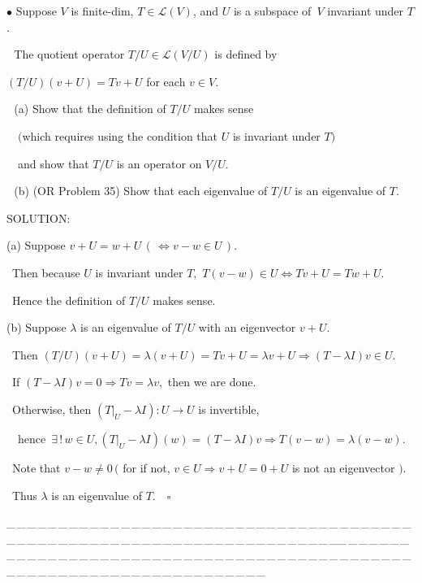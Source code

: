 \documentclass[a4paper, 11pt, UTF8]{article}
\def\Lm{\mathcal{L}}
\begin{document}
\begin{large}
{\small $\bullet$} {\timessl\Large 
Suppose $V$ is finite-dim, $T\in\Lm(V)$, and $U$ is a subspace of \,$V$ invariant under $T$.}\par\,\,
{\timessl\Large The quotient operator $T/U\in\Lm(V/U)$ is defined by}\par \centerline{\timessl\Large $(T/U)(v + U) = Tv + U$ for each $v\in V$.}\par\,\,
(a) {\timessl\Large Show that the definition of $T/U$ makes sense}\par\quad\,\,\,\,
$(${\timessl\Large which requires using the condition that $U$ is invariant under $T$}$)$\par\quad\,\,\,\,
{\timessl\Large and show that $T/U$ is an operator on $V/U$.}\par\,\,
(b) {\normalsize (O{\footnotesize R} Problem 35)} {\timessl\Large Show that each eigenvalue of $T/U$ is an eigenvalue of $T$.
}\par
{\timesbf S\footnotesize{OLUTION:}}\par\quad
(a) Suppose $v+U=w+U\,(\,\Longleftrightarrow v-w\in U\,).$\par\qquad\,
Then because $U$ is invariant under $T,$ $T(v-w)\in U\Longleftrightarrow Tv+U=Tw+U.$\par\qquad\,
Hence the definition of $T/U$ makes sense.\par\quad
(b) Suppose $\lambda$ is an eigenvalue of $T/U$ with an eigenvector $v+U.$\par\qquad\,
Then $(T/U)(v+U)=\lambda(v+U)=Tv+U=\lambda v+U\Rightarrow (T-\lambda I)v\in U.$\par\qquad\,
If $(T-\lambda I)v=0\Rightarrow Tv=\lambda v,$ then we are done.\par\qquad\,
Otherwise, then $(T|_U-\lambda I):U\rightarrow U$ is invertible,\par\qquad\qquad\qquad\,\,\,\,
hence $\,\exists\,!\,w\in U,(T|_U-\lambda I)(w)=(T-\lambda I) v\Rightarrow T(v-w)=\lambda (v-w).$\par\qquad\,
Note that $v-w\neq 0\,($ for if not, $v\in U\Rightarrow v+U=0+U$ is not an eigenvector $).$\par\qquad\,
Thus $\lambda$ is an eigenvalue of $T.\quad\square$\par
{\tiny \_\,\_\,\_\,\_\,\_\,\_\,\_\,\_\,\_\,\_\,\_\,\_\,\_\,\_\,\_\,\_\,\_\,\_\,\_\,\_\,\_\,\_\,\_\,\_\,\_\,\_\,\_\,\_\,\_\,\_\,\_\,\_\,\_\,\_\,\_\,\_\,\_\,\_\,\_\,\_\,\_\,\_\,\_\,\_\,\_\,\_\,\_\,\_\,\_\,\_\,\_\,\_\,\_\,\_\,\_\,\_\,\_\,\_\,\_\,\_\,\_\,\_\,\_\,\_\,\_\,\_\,\_\,\_\,\_\,\_\,\_\_\,\_\,\_\,\_\,\_\,\_\,\_\,\_\,\_\,\_\,\_\,\_\,\_\,\_\,\_\,\_\,\_\,\_\,\_\,\_\,\_\,\_\,\_\,\_\,\_\,\_\,\_\,\_\,\_\,\_\,\_\,\_\,\_\,\_\,\_\,\_\,\_\,\_\,\_\,\_\,\_\,\_\,\_\,\_\,\_\,\_\,\_\,\_\,\_\,\_\,\_\,\_\,\_\,\_\,\_\,\_\,\_\,\_\,\_\,\_\,\_\,\_\,\_\,\_\,\_\,\_\,\_\,\_\,\_\,\_\,\_}\par


\end{large}
\end{document}
